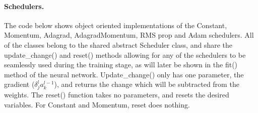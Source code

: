 \documentclass[%
oneside,                 %
final,                   %
10pt]{article}
\begin{document}
\paragraph{Schedulers.}
The code below shows object oriented implementations of the Constant,
Momentum, Adagrad, AdagradMomentum, RMS prop and Adam schedulers. All
of the classes belong to the shared abstract Scheduler class, and
share the update_change() and reset() methods allowing for any of the
schedulers to be seamlessly used during the training stage, as will
later be shown in the fit() method of the neural
network. Update_change() only has one parameter, the gradient
($\delta^{l}_{j}a^{l-1}_k$), and returns the change which will be
subtracted from the weights. The reset() function takes no parameters,
and resets the desired variables. For Constant and Momentum, reset
does nothing.
\end{document}
